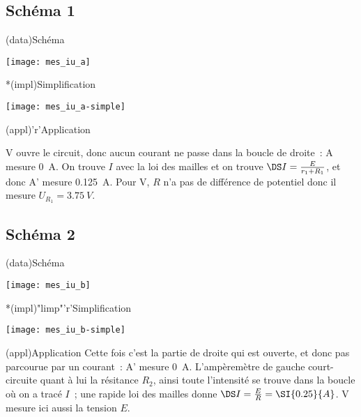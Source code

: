 \documentclass[../TDE1-E2.tex]{subfiles}%
\begin{document}
{\subsection{Schéma 1}
\begin{tcbraster}[raster columns=3, raster equal height=rows]
    \begin{tcn}(data){Schéma}
        \begin{center}
            \hspace*{-12pt}
            \texttt{[image: mes\_iu\_a]}
        \end{center}
    \end{tcn}
    \begin{tcn}*(impl){Simplification}
        \begin{center}
            \hspace*{-12pt}
            \texttt{[image: mes\_iu\_a-simple]}
        \end{center}
    \end{tcn}
    \begin{tcn}(appl)'r'{Application}

        V ouvre le circuit, donc aucun courant ne passe dans la boucle de
        droite~: A mesure \SI{0}{A}. On trouve $I$ avec la loi des mailles et on
        trouve $\DS I = \frac{E}{r_1 + R_1}$, et donc A' mesure \SI{0.125}{A}.
        Pour V, $R$ n'a pas de différence de potentiel donc il mesure $U_{R_1}
        = \SI{3.75}{V}$.

    \end{tcn}
\end{tcbraster}
\subsection{Schéma 2}
\begin{tcbraster}[raster columns=2, raster equal height=rows]
    \begin{tcn}(data){Schéma}
        \begin{center}
            \texttt{[image: mes\_iu\_b]}
        \end{center}
    \end{tcn}
    \begin{tcn}*(impl)"limp"'r'{Simplification}
        \begin{center}
           \texttt{[image: mes\_iu\_b-simple]}
        \end{center} 
    \end{tcn}
\end{tcbraster}
\begin{center}
    \begin{tcn}[width=\linewidth](appl){Application}
        Cette fois c'est la partie de droite qui est ouverte, et donc pas
        parcourue par un courant~: A' mesure \SI{0}{A}. L'ampèremètre de gauche
        court-circuite quant à lui la résitance $R_2$, ainsi toute l'intensité
        se trouve dans la boucle où on a tracé \textcolor{brandeisblue}{$I$}~;
        une rapide loi des mailles donne $\DS I = \frac{E}{R} = \SI{0.25}{A}$. V
        mesure ici aussi la tension $E$.
    \end{tcn}
\end{center}
}
\end{document}
